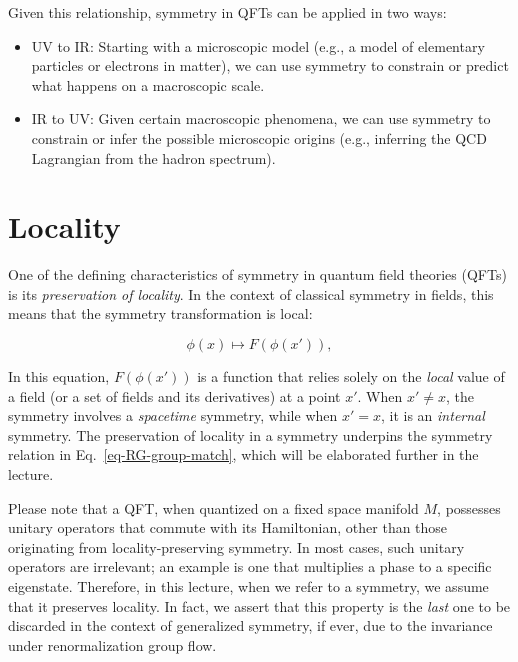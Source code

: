 \documentclass[11pt,toc=bibliography]{scrbook}
\numberwithin{equation}{section}
\providecommand{\tightlist}{%
  \setlength{\itemsep}{0pt}\setlength{\parskip}{0pt}}
\begin{document}
Given this relationship, symmetry in QFTs can be applied in two ways:

\begin{itemize}
  \tightlist
  \item UV to IR: Starting with a microscopic model (e.g., a model of elementary particles or electrons in matter), we can use symmetry to constrain or predict what happens on a macroscopic scale.
  \item IR to UV: Given certain macroscopic phenomena, we can use symmetry to constrain or infer the possible microscopic origins (e.g., inferring the QCD Lagrangian from the hadron spectrum).
\end{itemize}


\section{Locality}

One of the defining characteristics of symmetry in quantum field theories (QFTs) is its \emph{preservation of locality}. In the context of classical symmetry in fields, this means that the symmetry transformation is local:

\begin{equation}
  \phi(x) \mapsto F(\phi(x')),
  \label{eq: field-transform}
\end{equation}

In this equation, \(F(\phi(x'))\) is a function that relies solely on the \emph{local} value of a field (or a set of fields and its derivatives) at a point \(x'\). When \(x'\neq x\), the symmetry involves a \emph{spacetime} symmetry, while when \(x'=x\), it is an \emph{internal} symmetry. The preservation of locality in a symmetry underpins the symmetry relation in Eq.~\eqref{eq-RG-group-match}, which will be elaborated further in the lecture.

\begin{note}{}
  Please note that a QFT, when quantized on a fixed space manifold \(M\), possesses unitary operators that commute with its Hamiltonian, other than those originating from locality-preserving symmetry. In most cases, such unitary operators are irrelevant; an example is one that multiplies a phase to a specific eigenstate. Therefore, in this lecture, when we refer to a symmetry, we assume that it preserves locality. In fact, we assert that this property is the \emph{last} one to be discarded in the context of generalized symmetry, if ever, due to the invariance under renormalization group flow.\footnotemark{}
\end{note}
\end{document}
